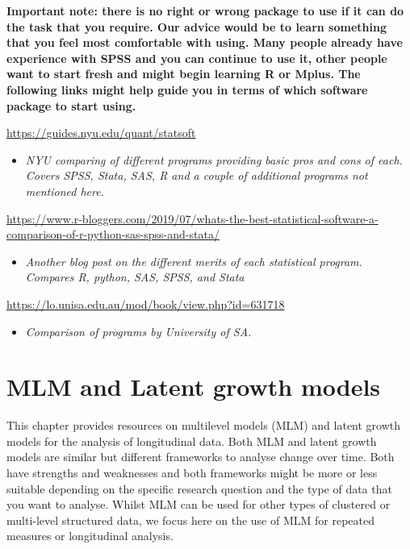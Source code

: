 \documentclass[
]{book}
\providecommand{\tightlist}{%
  \setlength{\itemsep}{0pt}\setlength{\parskip}{0pt}}
\begin{document}
\textbf{Important note: there is no right or wrong package to use if it can do the task that you require. Our advice would be to learn something that you feel most comfortable with using. Many people already have experience with SPSS and you can continue to use it, other people want to start fresh and might begin learning R or Mplus. The following links might help guide you in terms of which software package to start using. }

\url{https://guides.nyu.edu/quant/statsoft}

\begin{itemize}
\tightlist
\item
  \emph{NYU comparing of different programs providing basic pros and cons of each. Covers SPSS, Stata, SAS, R and a couple of additional programs not mentioned here.}
\end{itemize}

\url{https://www.r-bloggers.com/2019/07/whats-the-best-statistical-software-a-comparison-of-r-python-sas-spss-and-stata/}

\begin{itemize}
\tightlist
\item
  \emph{Another blog post on the different merits of each statistical program. Compares R, python, SAS, SPSS, and Stata}
\end{itemize}

\url{https://lo.unisa.edu.au/mod/book/view.php?id=631718}

\begin{itemize}
\tightlist
\item
  \emph{Comparison of programs by University of SA.}
\end{itemize}

\chapter{MLM and Latent growth models}\label{mlm-and-latent-growth-models}

This chapter provides resources on multilevel models (MLM) and latent growth models for the analysis of longitudinal data. Both MLM and latent growth models are similar but different frameworks to analyse change over time. Both have strengths and weaknesses and both frameworks might be more or less suitable depending on the specific research question and the type of data that you want to analyse. Whilst MLM can be used for other types of clustered or multi-level structured data, we focus here on the use of MLM for repeated measures or longitudinal analysis.
\end{document}
